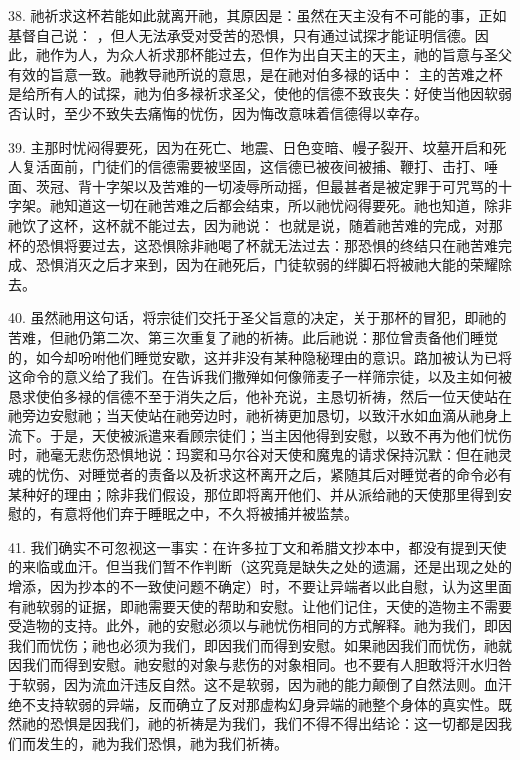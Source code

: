 38. 祂祈求这杯若能如此就离开祂，其原因是：虽然在天主没有不可能的事，正如基督自己说： ，但人无法承受对受苦的恐惧，只有通过试探才能证明信德。因此，祂作为人，为众人祈求那杯能过去，但作为出自天主的天主，祂的旨意与圣父有效的旨意一致。祂教导祂所说的意思，是在祂对伯多禄的话中：  主的苦难之杯是给所有人的试探，祂为伯多禄祈求圣父，使他的信德不致丧失：好使当他因软弱否认时，至少不致失去痛悔的忧伤，因为悔改意味着信德得以幸存。\par

39. 主那时忧闷得要死，因为在死亡、地震、日色变暗、幔子裂开、坟墓开启和死人复活面前，门徒们的信德需要被坚固，这信德已被夜间被捕、鞭打、击打、唾面、茨冠、背十字架以及苦难的一切凌辱所动摇，但最甚者是被定罪于可咒骂的十字架。祂知道这一切在祂苦难之后都会结束，所以祂忧闷得要死。祂也知道，除非祂饮了这杯，这杯就不能过去，因为祂说： 也就是说，随着祂苦难的完成，对那杯的恐惧将要过去，这恐惧除非祂喝了杯就无法过去：那恐惧的终结只在祂苦难完成、恐惧消灭之后才来到，因为在祂死后，门徒软弱的绊脚石将被祂大能的荣耀除去。\par

40. 虽然祂用这句话，将宗徒们交托于圣父旨意的决定，关于那杯的冒犯，即祂的苦难，但祂仍第二次、第三次重复了祂的祈祷。此后祂说：那位曾责备他们睡觉的，如今却吩咐他们睡觉安歇，这并非没有某种隐秘理由的意识。路加被认为已将这命令的意义给了我们。在告诉我们撒殚如何像筛麦子一样筛宗徒，以及主如何被恳求使伯多禄的信德不至于消失之后，他补充说，主恳切祈祷，然后一位天使站在祂旁边安慰祂；当天使站在祂旁边时，祂祈祷更加恳切，以致汗水如血滴从祂身上流下。于是，天使被派遣来看顾宗徒们；当主因他得到安慰，以致不再为他们忧伤时，祂毫无悲伤恐惧地说：玛窦和马尔谷对天使和魔鬼的请求保持沉默：但在祂灵魂的忧伤、对睡觉者的责备以及祈求这杯离开之后，紧随其后对睡觉者的命令必有某种好的理由；除非我们假设，那位即将离开他们、并从派给祂的天使那里得到安慰的，有意将他们弃于睡眠之中，不久将被捕并被监禁。\par

41. 我们确实不可忽视这一事实：在许多拉丁文和希腊文抄本中，都没有提到天使的来临或血汗。但当我们暂不作判断（这究竟是缺失之处的遗漏，还是出现之处的增添，因为抄本的不一致使问题不确定）时，不要让异端者以此自慰，认为这里面有祂软弱的证据，即祂需要天使的帮助和安慰。让他们记住，天使的造物主不需要受造物的支持。此外，祂的安慰必须以与祂忧伤相同的方式解释。祂为我们，即因我们而忧伤；祂也必须为我们，即因我们而得到安慰。如果祂因我们而忧伤，祂就因我们而得到安慰。祂安慰的对象与悲伤的对象相同。也不要有人胆敢将汗水归咎于软弱，因为流血汗违反自然。这不是软弱，因为祂的能力颠倒了自然法则。血汗绝不支持软弱的异端，反而确立了反对那虚构幻身异端的祂整个身体的真实性。既然祂的恐惧是因我们，祂的祈祷是为我们，我们不得不得出结论：这一切都是因我们而发生的，祂为我们恐惧，祂为我们祈祷。\par

